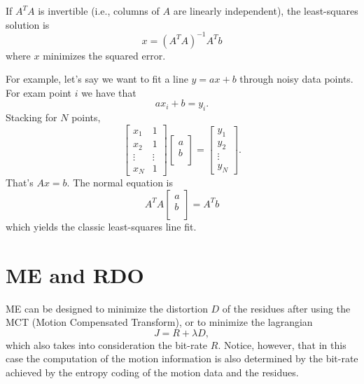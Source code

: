 If $A^TA$ is invertible (i.e., columns of $A$ are linearly independent), the least-squares solution is
\begin{equation}
  x = (A^TA)^{-1}A^Tb
\end{equation}
where $x$ minimizes the squared error.

For example, let's say we want to fit a line $y=ax+b$ through noisy data points. For exam point $i$ we have that
\begin{equation*}
  ax_i+b = y_i.
\end{equation*}
Stacking for $N$ points,
\begin{equation*}
  \begin{bmatrix}
x_1 & 1 \\
x_2 & 1 \\
\vdots & \vdots \\
x_N & 1
\end{bmatrix}
\begin{bmatrix}
a \\
b \\
\end{bmatrix} =
\begin{bmatrix}
y_1 \\
y_2 \\
\vdots \\
y_N
\end{bmatrix}.
\end{equation*}
That's $Ax=b$. The normal equation is
\begin{equation*}
A^TA
\begin{bmatrix}
a \\
b \\
\end{bmatrix} =
A^Tb
\end{equation*}
which yields the classic least-squares line fit.

\section{ME and RDO}

ME can be designed to minimize the distortion $D$ of the residues
after using the MCT (Motion Compensated Transform), or to minimize the
lagrangian
\begin{equation}
  J = R + \lambda D,
\end{equation}
which also takes into consideration the bit-rate $R$. Notice, however,
that in this case the computation of the motion information is also
determined by the bit-rate achieved by the entropy coding of the
motion data and the residues.

